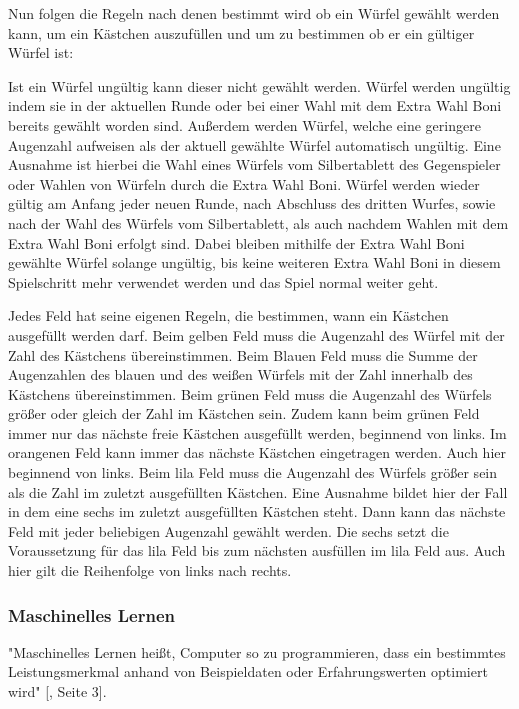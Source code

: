 Nun folgen die Regeln nach denen bestimmt wird ob ein Würfel gewählt werden kann, um ein Kästchen auszufüllen und um zu bestimmen ob er ein gültiger Würfel ist:

Ist ein Würfel ungültig kann dieser nicht gewählt werden. Würfel werden ungültig indem sie in der aktuellen Runde oder bei einer Wahl mit dem Extra Wahl Boni bereits gewählt worden sind. Außerdem werden Würfel, welche eine geringere Augenzahl aufweisen als der aktuell gewählte Würfel automatisch ungültig. Eine Ausnahme ist hierbei die Wahl eines Würfels vom Silbertablett des Gegenspieler oder Wahlen von Würfeln durch die Extra Wahl Boni. Würfel werden wieder gültig am Anfang jeder neuen Runde, nach Abschluss des dritten Wurfes, sowie nach der Wahl des Würfels vom Silbertablett, als auch nachdem Wahlen mit dem Extra Wahl Boni erfolgt sind. Dabei bleiben mithilfe der Extra Wahl Boni gewählte Würfel solange ungültig, bis keine weiteren Extra Wahl Boni in diesem Spielschritt mehr verwendet werden und das Spiel normal weiter geht.

Jedes Feld hat seine eigenen Regeln, die bestimmen, wann ein Kästchen ausgefüllt werden darf. Beim gelben Feld muss die Augenzahl des Würfel mit der Zahl des Kästchens übereinstimmen. Beim Blauen Feld muss die Summe der Augenzahlen des blauen und des weißen Würfels mit der Zahl innerhalb des Kästchens übereinstimmen. Beim grünen Feld muss die Augenzahl des Würfels größer oder gleich der Zahl im Kästchen sein. Zudem kann beim grünen Feld immer nur das nächste freie Kästchen ausgefüllt werden, beginnend von links. Im orangenen Feld kann immer das nächste Kästchen eingetragen werden. Auch hier beginnend von links. Beim lila Feld muss die Augenzahl des Würfels größer sein als die Zahl im zuletzt ausgefüllten Kästchen. Eine Ausnahme bildet hier der Fall in dem eine sechs im zuletzt ausgefüllten Kästchen steht. Dann kann das nächste Feld mit jeder beliebigen Augenzahl gewählt werden. Die sechs setzt die Voraussetzung für das lila Feld bis zum nächsten ausfüllen im lila Feld aus. Auch hier gilt die Reihenfolge von links nach rechts.
\subsubsection{Maschinelles Lernen}
"Maschinelles Lernen heißt, Computer so zu programmieren, dass ein bestimmtes Leistungsmerkmal anhand von Beispieldaten oder Erfahrungswerten optimiert wird" [\cite{alpaydin_maschinelles_2022}, Seite 3].

